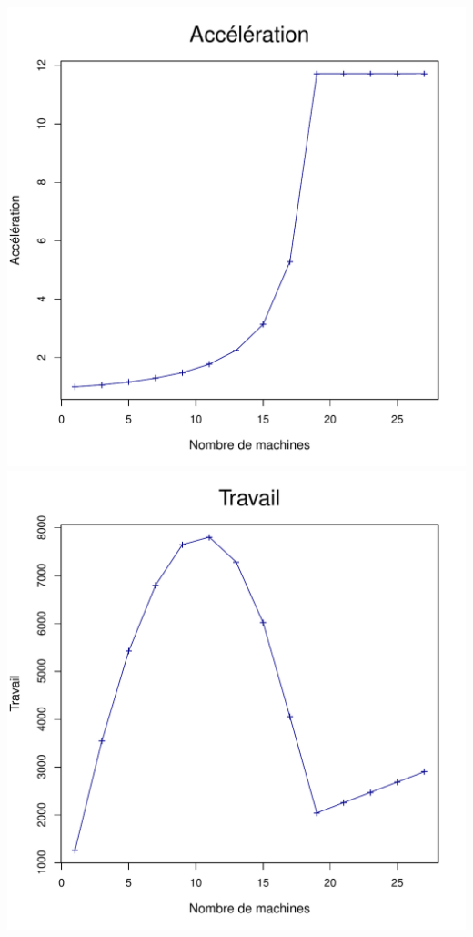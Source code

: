 \documentclass[a4paper, 11pt, titlepage]{article}
\begin{document}
\begin{center}
    \includegraphics[scale=0.45]{res/sujet_makefiles_premier_Makefile_nth1_acc.pdf}
    \includegraphics[scale=0.45]{res/sujet_makefiles_premier_Makefile_nth1_work.pdf}
\end{center}
\end{document}
